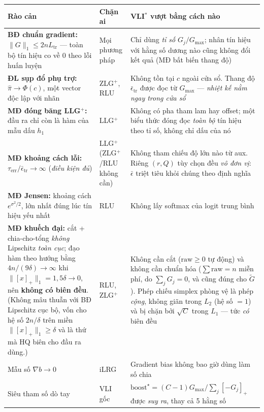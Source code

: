 \documentclass[11pt]{article}
\newcommand{\pos}[1]{\left[#1\right]_+}
\begin{document}
\vspace{0.4em}
\footnotesize
\noindent
\begin{tabular}{@{}p{5.2cm} p{3.2cm} p{15.8cm}@{}}
\toprule
\textbf{Rào cản} & \textbf{Chặn ai} & \textbf{VLI$^\ast$ vượt bằng cách nào} \\
\midrule

\textbf{BĐ chuẩn gradient:}
$\|G\|_1\le 2nL_{\text{tr}}$ --- toàn bộ tín hiệu co về 0 theo lỗi huấn luyện &
Mọi phương pháp &
Chỉ dùng \emph{tỉ số} $G_j/G_{\max}$; nhân tín hiệu với hằng số dương nào
cũng không đổi kết quả (MĐ bất biến thang độ) \\

\textbf{ĐL sụp đổ phụ trợ:}
$\widehat\pi\to\Phi(c)$, một vector độc lập với nhãn &
ZLG$^+$, RLU &
Không tồn tại $c$ ngoài cửa sổ. Thang độ $\bar\epsilon_{\text{tr}}$ được đọc
từ $G_{\max}$ --- \emph{nhiệt kế nằm ngay trong cửa sổ} \\

\textbf{MĐ đóng băng LLG$^+$:}
đầu ra chỉ còn là hàm của mẫu dấu $h_1$ &
LLG$^+$ &
Không có pha tham lam hay offset; một biểu thức đóng đọc \emph{toàn bộ} tín
hiệu theo tỉ số, không chỉ dấu của nó \\

\textbf{MĐ khoảng cách lỗi:}
$\tau_{\text{err}}/\bar\epsilon_{\text{tr}}\to\infty$ (\emph{điều kiện đủ}) &
LLG$^+$ \mbox{(ZLG$^+$/RLU} không cần) &
Không tham chiếu độ lớn nào từ aux. Riêng $(r,Q)$ tùy chọn đều \emph{vô đơn
vị}: $\bar\epsilon$ triệt tiêu khỏi chúng theo định nghĩa \\

\textbf{MĐ Jensen:}
khoảng cách $e^{\sigma^2/2}$, lớn nhất đúng lúc tín hiệu yếu nhất &
RLU &
Không lấy softmax của logit trung bình \\

\textbf{MĐ khuếch đại:} cắt + chia-cho-tổng \emph{không} Lipschitz
\emph{toàn cục}; đạo hàm theo hướng bằng $4n/(9\delta)\to\infty$ khi
$\|\pos{x}\|_1=1{,}5\delta\to0$, nên \textbf{không có biên đều}. (Không mâu
thuẫn với BĐ Lipschitz cục bộ, vốn cho hệ số $2n/\delta$ trên miền
$\|\pos{x}\|_1\ge\delta$ và là thứ mà HQ biên cho đầu ra dùng.) &
RLU, ZLG$^+$ &
Không cần cắt ($\text{raw}\ge0$ tự động) và không cần chuẩn hóa
($\sum\text{raw}=n$ miễn phí, do $\sum_j G_j=0$, và cũng đúng cho $\tilde G$).
Phép chiếu simplex phòng vệ là phép \emph{cộng}, không giãn trong $L_2$ (hệ
số $=1$) và bị chặn bởi $\sqrt C$ trong $L_1$ --- tức \emph{có} biên đều \\

Mẫu số $\nabla b\to0$ &
iLRG &
Gradient bias không bao giờ dùng làm số chia \\

Siêu tham số dò tay &
VLI gốc &
$\text{boost}^\star=(C-1)G_{\max}/\sum_j\pos{-G_j}$ được \emph{suy ra}, thay
cả 5 hằng số \\

\bottomrule
\end{tabular}
\end{document}
